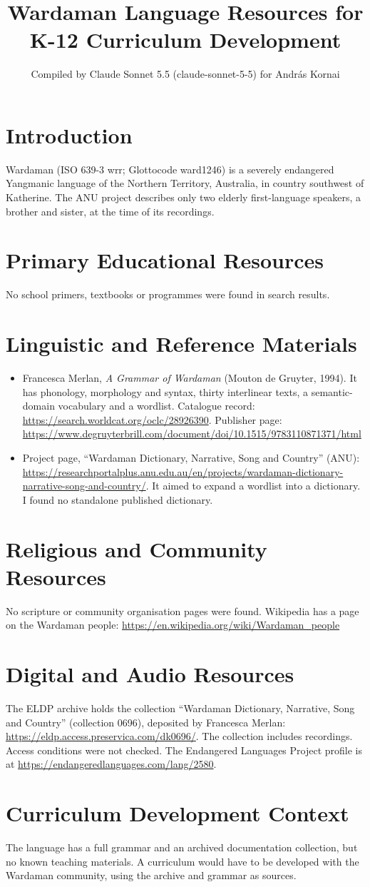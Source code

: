 \documentclass[12pt]{article}
\title{Wardaman Language Resources for K-12 Curriculum Development}
\author{Compiled by Claude Sonnet 5.5 (claude-sonnet-5-5) for Andr\'as Kornai}
\date{}
\begin{document}
\maketitle

\section{Introduction}
Wardaman (ISO 639-3 wrr; Glottocode ward1246) is a severely endangered Yangmanic language of the Northern Territory, Australia, in country southwest of Katherine. The ANU project describes only two elderly first-language speakers, a brother and sister, at the time of its recordings.

\section{Primary Educational Resources}
No school primers, textbooks or programmes were found in search results.

\section{Linguistic and Reference Materials}
\begin{itemize}
\item Francesca Merlan, \emph{A Grammar of Wardaman} (Mouton de Gruyter, 1994). It has phonology, morphology and syntax, thirty interlinear texts, a semantic-domain vocabulary and a wordlist. Catalogue record: \url{https://search.worldcat.org/oclc/28926390}. Publisher page: \url{https://www.degruyterbrill.com/document/doi/10.1515/9783110871371/html}
\item Project page, ``Wardaman Dictionary, Narrative, Song and Country'' (ANU): \url{https://researchportalplus.anu.edu.au/en/projects/wardaman-dictionary-narrative-song-and-country/}. It aimed to expand a wordlist into a dictionary. I found no standalone published dictionary.
\end{itemize}

\section{Religious and Community Resources}
No scripture or community organisation pages were found. Wikipedia has a page on the Wardaman people: \url{https://en.wikipedia.org/wiki/Wardaman_people}

\section{Digital and Audio Resources}
The ELDP archive holds the collection ``Wardaman Dictionary, Narrative, Song and Country'' (collection 0696), deposited by Francesca Merlan: \url{https://eldp.access.preservica.com/dk0696/}. The collection includes recordings. Access conditions were not checked. The Endangered Languages Project profile is at \url{https://endangeredlanguages.com/lang/2580}.

\section{Curriculum Development Context}
The language has a full grammar and an archived documentation collection, but no known teaching materials. A curriculum would have to be developed with the Wardaman community, using the archive and grammar as sources.
\end{document}

